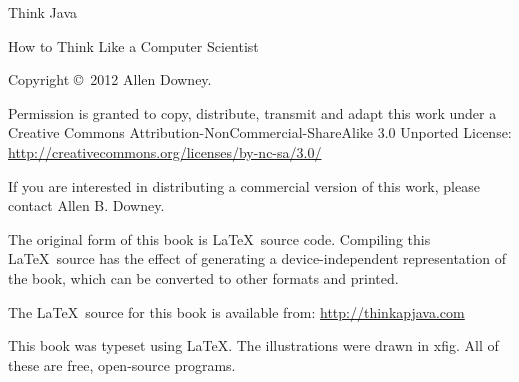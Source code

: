 

\frontmatter


%
%
%
%
%
%



\pagebreak
\thispagestyle{empty}

\begin{flushright}
\vspace*{2.5in}

{\huge Think Java}

\vspace{0.25in}

{\LARGE How to Think Like a Computer Scientist}

\vspace{1in}

{\Large
\theauthors
}


\vspace{1in}

{\Large \theversion}

\vfill

\end{flushright}


\pagebreak
\thispagestyle{empty}

Copyright \copyright ~2012 Allen Downey.

\vspace{0.25in}

Permission is granted to copy, distribute, transmit and adapt
this work under a Creative Commons
Attribution-NonCommercial-ShareAlike 3.0 Unported License:
\url{http://creativecommons.org/licenses/by-nc-sa/3.0/}

If you are interested in distributing a commercial version of this
work, please contact Allen B. Downey.

The original form of this book is \LaTeX\ source code.  Compiling this
\LaTeX\ source has the effect of generating a device-independent
representation of the book, which can be converted to other formats
and printed.

The \LaTeX\ source for this book is available from:
\url{http://thinkapjava.com}

This book was typeset using \LaTeX .  The illustrations were
drawn in xfig.  All of these are free, open-source programs.

\vspace{0.25in}


